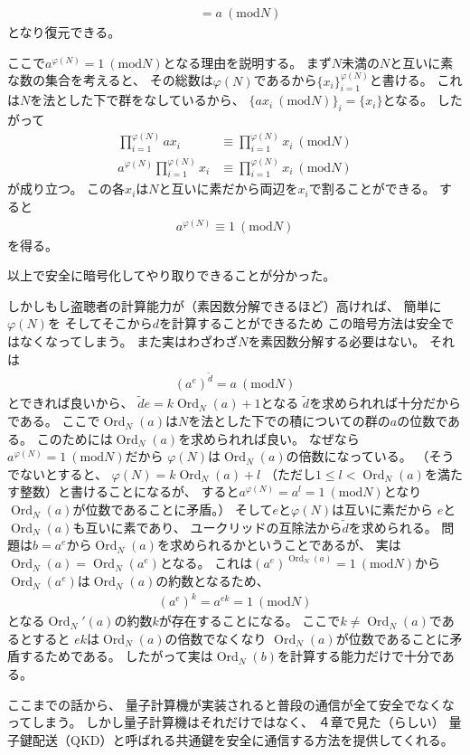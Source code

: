 \documentclass[a4paper, 10pt]{jsarticle}
\DeclareMathOperator{\Ord}{Ord}
\begin{document}
\begin{enumerate}
\begin{enumerate}
\begin{align}
			&= a \ (\mathrm{mod} N)
		\end{align}
		となり復元できる。
	\end{enumerate}
	ここで$a^{\varphi (N)} = 1 \ (\mathrm{mod} N)$となる理由を説明する。
	まず$N$未満の$N$と互いに素な数の集合を考えると、
	その総数は$\varphi (N)$であるから$\{x_i\}_{i=1}^{\varphi (N)}$と書ける。
	これは$N$を法とした下で群をなしているから、
	$\{ ax_i \ (\mathrm{mod} N) \}_i = \{x_i\}$となる。
	したがって
	\begin{align}
		\prod_{i=1}^{\varphi (N)} a x_i
		&\equiv \prod_{i=1}^{\varphi (N)} x_i \ (\mathrm{mod} N) \\
		a^{\varphi (N)} \prod_{i=1}^{\varphi (N)} x_i
		&\equiv \prod_{i=1}^{\varphi (N)} x_i \ (\mathrm{mod} N)
	\end{align}
	が成り立つ。
	この各$x_i$は$N$と互いに素だから両辺を$x_i$で割ることができる。
	すると
	\begin{align}
		a^{\varphi (N)} \equiv 1 \ (\mathrm{mod} N)
	\end{align}
	を得る。
\end{enumerate}
以上で安全に暗号化してやり取りできることが分かった。

しかしもし盗聴者の計算能力が（素因数分解できるほど）高ければ、
簡単に$\varphi (N)$を
そしてそこから$d$を計算することができるため
この暗号方法は安全ではなくなってしまう。
また実はわざわざ$N$を素因数分解する必要はない。
それは
\begin{align}
	\left( a^e \right)^{\tilde{d}} = a \ (\mathrm{mod} N)
\end{align}
とできれば良いから、
$\tilde{d} e = k \Ord_N (a) + 1$となる
$\tilde{d}$を求められれば十分だからである。
ここで$\Ord_N (a)$は$N$を法とした下での積についての群の$a$の位数である。
このためには$\Ord_N (a)$を求められれば良い。
なぜなら$a^{\varphi (N)} = 1 \ (\mathrm{mod} N)$だから
$\varphi (N)$は$\Ord_N (a)$の倍数になっている。
（そうでないとすると、
$\varphi (N) = k \Ord_N (a) + l$
（ただし$1 \leq l < \Ord_N (a)$を満たす整数）と書けることになるが、
すると$a^{\varphi (N)} = a^l = 1 \ (\mathrm{mod} N)$となり
$\Ord_N (a)$が位数であることに矛盾。）
そして$e$と$\varphi (N)$は互いに素だから
$e$と$\Ord_N (a)$も互いに素であり、
ユークリッドの互除法から$\tilde{d}$を求められる。
問題は$b = a^e$から$\Ord_N (a)$を求められるかということであるが、
実は$\Ord_N (a) = \Ord_N \left( a^e \right)$となる。
これは$\left( a^e \right)^{\Ord_N (a)} = 1 \ (\mathrm{mod} N)$から
$\Ord_N (a^e)$は$\Ord_N (a)$の約数となるため、
\begin{align}
	\left( a^e \right)^k = a^{ek} = 1 \ (\mathrm{mod} N)
\end{align}
となる$\Ord_N '(a)$の約数$k$が存在することになる。
ここで$k \neq \Ord_N (a)$であるとすると
$ek$は$\Ord_N (a)$の倍数でなくなり
$\Ord_N (a)$が位数であることに矛盾するためである。
したがって実は$\Ord_N (b)$を計算する能力だけで十分である。

ここまでの話から、
量子計算機が実装されると普段の通信が全て安全でなくなってしまう。
しかし量子計算機はそれだけではなく、
４章で見た（らしい）
量子鍵配送（QKD）と呼ばれる共通鍵を安全に通信する方法を提供してくれる。
\end{document}
